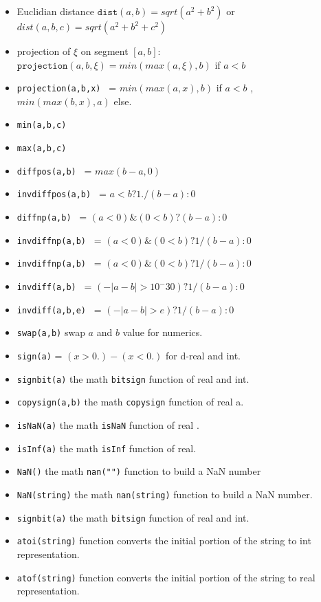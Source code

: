 \documentclass[a4paper,twoside,12pt]{book}
\begin{document}
\begin{description}
\begin{itemize}
\end{itemize}
 \par

\index{}\index{}
\begin{itemize}
\item Euclidian distance $\mathtt{dist}(a,b) = sqrt(a^2+b^2)$ or $dist(a,b,c) = sqrt(a^2+b^2+c^2)$
\item projection of $\xi$ on segment $[a,b]$:  $\mathtt{projection}(a,b,\xi)  =   min(max(a,\xi),b)$  if $a< b$ 
\item \verb!projection(a,b,x) ! = $min(max(a,x),b)$ if $a < b$ ,  $min(max(b,x),a)$ else.
\item \verb!min(a,b,c) ! 
\item \verb!max(a,b,c) ! 
\item \verb!diffpos(a,b) ! = $ max(b-a,0) $
\item \verb!invdiffpos(a,b) ! = $ a<b ? 1./(b-a): 0 $
\item \verb!diffnp(a,b) ! = $ (a<0) \& (0< b)  ? (b-a): 0 $
\item \verb!invdiffnp(a,b) ! = $ (a<0) \& (0< b)  ? 1/(b-a): 0 $
\item \verb!invdiffnp(a,b) ! = $ (a<0) \& (0< b)  ? 1/(b-a): 0 $
\item \verb!invdiff(a,b) ! = $ (-|a-b| > 10^-{30})  ? 1/(b-a): 0 $
\item \verb!invdiff(a,b,e) ! = $ (-|a-b| > e)  ? 1/(b-a): 0 $
\item \verb!swap(a,b)! swap $a$ and $b$ value for numerics. 
\item \verb!sign(a)! = $(x>0.)-(x<0.)$ for d-real and int.  
\item \verb!signbit(a)! the math \texttt {bitsign} function of real and int.  
\item \verb!copysign(a,b)! the math \texttt {copysign} function of real a.   
\item \verb!isNaN(a)! the math \texttt {isNaN} function of real .   
\item \verb!isInf(a)! the math \texttt {isInf} function of real.   
\item \verb!NaN()! the math \texttt {nan("")} function to build a NaN number
\item \verb!NaN(string)! the math \texttt {nan(string)} function to build a NaN number.  

\item \verb!signbit(a)! the math \texttt {bitsign} function of real and int.  
\item \verb!atoi(string)! function converts the initial portion of the string to int representation. 
\item \verb!atof(string)! function converts the initial portion of the string to real representation. 

\end{itemize}
\end{description}
\end{document}
